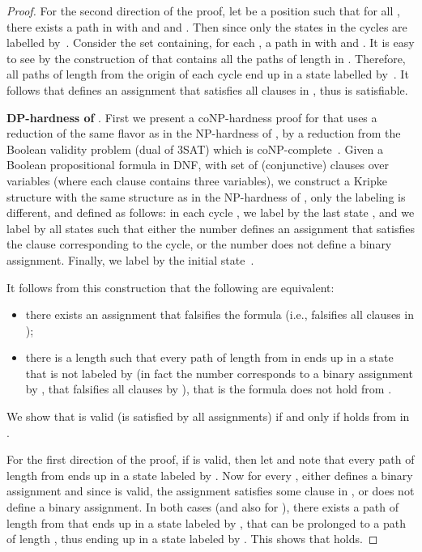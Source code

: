 \documentclass{article}
\begin{document}
\begin{proof}
For the second direction of the proof, let  be a position such that for all , 
there exists a path  in  with  and 
 and . Then  since only the states
in the cycles are labelled by~. Consider the set  containing, for each ,
a path  in  with  and . 
It is easy to see by the construction of  that  contains all the paths 
of length  in . Therefore, all paths of length  from the
origin of each cycle end up in a state labelled by~. It follows that 
defines an assignment that satisfies all clauses in , thus 
is satisfiable.

{\bf DP-hardness of }. 
First we present a coNP-hardness proof for  that uses a reduction of the same flavor as 
in the NP-hardness of ,
by a reduction from the Boolean validity problem (dual of 3SAT) which is coNP-complete~\cite{Cook71}.
Given a Boolean propositional formula  in DNF, with set  of (conjunctive)
clauses over variables  (where each clause contains 
three variables), we construct a Kripke structure  with the same structure
as in the NP-hardness of , only the labeling is different, and defined
as follows: in each cycle , we label by  the last state 
, and we label by  all states  such that either  the number  
defines an assignment that satisfies the clause corresponding to the cycle,
or  the number  does not define a binary assignment.
Finally, we label by  the initial state~.

It follows from this construction that the following are equivalent:
\begin{itemize}
\item there exists an assignment that falsifies the formula  (i.e., falsifies
all clauses in );
\item there is a length  such that every path of length  from  in 
ends up in a state that is not labeled by  (in fact the number  
corresponds to a binary assignment by , that falsifies all clauses by ),
that is the formula  does not hold from .
\end{itemize}

We show that  is valid (is satisfied by all assignments) if and only if
 holds from  in .

For the first direction of the proof, if  is valid,
then let  and note that every path
of length  from  ends up in a state labeled by . Now for every
, either  defines a binary assignment and since  is valid, 
the assignment satisfies some clause in , or  does not define a binary 
assignment. In both cases (and also for ), there exists a path of length  
from  that ends up in a state labeled by , that can be prolonged to 
a path of length , thus ending up in a state labeled by . This shows that
 holds.


\end{proof}
\end{document}
